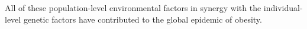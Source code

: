 
\noindent
All of these population-level environmental factors in synergy with the individual-level genetic factors have contributed to the global epidemic of obesity.






